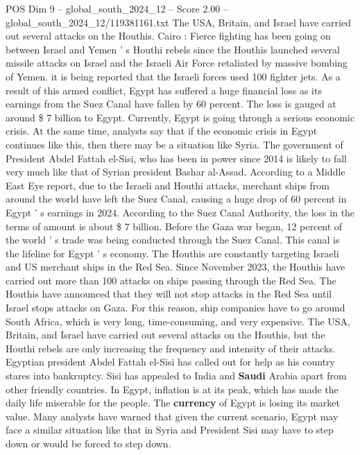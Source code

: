 \begin{textsample}{POS Dim 9 – global\_south\_2024\_12 – Score 2.00 – global\_south\_2024\_12/119381161.txt}  \label{ex:f9_pos_226}
The USA, Britain, and Israel have carried out several attacks on the Houthis.
Cairo : Fierce fighting has been going on between Israel and Yemen ' s Houthi rebels since the Houthis launched several missile attacks on Israel and the Israeli Air Force retaliated by massive bombing of Yemen. it is being reported that the Israeli forces used 100 fighter jets.
As a result of this armed conflict, Egypt has suffered a huge financial loss as its earnings from the Suez Canal have fallen by 60 percent.
The loss is gauged at around \$ 7 billion to Egypt.
Currently, Egypt is going through a serious economic crisis.
At the same time, analysts say that if the economic crisis in Egypt continues like this, then there may be a situation like Syria.
The government of President Abdel Fattah el-Sisi, who has been in power since 2014 is likely to fall very much like that of Syrian president Bashar al-Assad.
According to a Middle East Eye report, due to the Israeli and Houthi attacks, merchant ships from around the world have left the Suez Canal, causing a huge drop of 60 percent in Egypt ' s earnings in 2024.
According to the Suez Canal Authority, the loss in the terms of amount is about \$ 7 billion.
Before the Gaza war began, 12 percent of the world ' s trade was being conducted through the Suez Canal.
This canal is the lifeline for Egypt ' s economy.
The Houthis are constantly targeting Israeli and US merchant ships in the Red Sea.
Since November 2023, the Houthis have carried out more than 100 attacks on ships passing through the Red Sea.
The Houthis have announced that they will not stop attacks in the Red Sea until Israel stops attacks on Gaza.
For this reason, ship companies have to go around South Africa, which is very long, time-consuming, and very expensive.
The USA, Britain, and Israel have carried out several attacks on the Houthis, but the Houthi rebels are only increasing the frequency and intensity of their attacks.
Egyptian president Abdel Fattah el-Sisi has called out for help as his country stares into bankruptcy.
Sisi has appealed to India and \textbf{Saudi} Arabia apart from other friendly countries.
In Egypt, inflation is at its peak, which has made the daily life miserable for the people.
The \textbf{currency} of Egypt is losing its market value.
Many analysts have warned that given the current scenario, Egypt may face a similar situation like that in Syria and President Sisi may have to step down or would be forced to step down.

\end{textsample}
